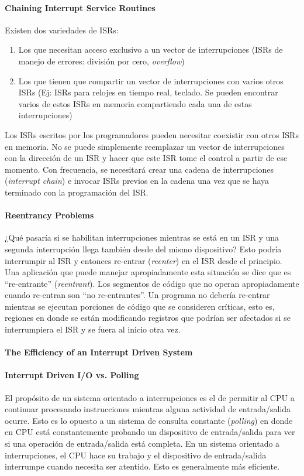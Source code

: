 \paragraph{\textnormal{\textbf{Chaining Interrupt Service Routines}}}
Existen dos variedades de ISRs:
\begin{enumerate}
    \item Los que necesitan acceso exclusivo a un vector de interrupciones (ISRs de manejo de errores: división por cero, \textit{overflow})
    \item Los que tienen que compartir un vector de interrupciones con varios otros ISRs (Ej: ISRs para relojes en tiempo real, teclado. Se pueden encontrar varios de estos ISRs en memoria compartiendo cada una de estas interrupciones)
\end{enumerate}
Los ISRs escritos por los programadores pueden necesitar coexistir con otros ISRs en memoria. No se puede simplemente reemplazar un vector de interrupciones con la dirección de un ISR y hacer que este ISR tome el control a partir de ese momento. Con frecuencia, se necesitará crear una cadena de interrupciones (\textit{interrupt chain}) e invocar ISRs previos en la cadena una vez que se haya terminado con la programación del ISR.

\paragraph{\textnormal{\textbf{Reentrancy Problems}}}
¿Qué pasaría si se habilitan interrupciones mientras se está en un ISR y una segunda interrupción llega también desde del mismo dispositivo? Esto podría interrumpir al ISR y entonces re-entrar (\textit{reenter}) en el ISR desde el principio. Una aplicación que puede manejar apropiadamente esta situación se dice que es ``re-entrante'' (\textit{reentrant}). Los segmentos de código que no operan apropiadamente cuando re-entran son ``no re-entrantes''. Un programa no debería re-entrar mientras se ejecutan porciones de código que se consideren críticas, esto es, regiones en donde se están modificando registros que podrían ser afectados si se interrumpiera el ISR y se fuera al inicio otra vez.


\paragraph{\textnormal{\textbf{The Efficiency of an Interrupt Driven System}}}

\paragraph{Interrupt Driven I/O vs. Polling}
El propósito de un sistema orientado a interrupciones es el de permitir al CPU a continuar procesando instrucciones mientras alguna actividad de entrada/salida ocurre. Esto es lo opuesto a un sistema de consulta constante (\textit{polling}) en donde en CPU está constantemente probando un dispositivo de entrada/salida para ver si una operación de entrada/salida está completa. En un sistema orientado a interrupciones, el CPU hace su trabajo y el dispositivo de entrada/salida interrumpe cuando necesita ser atentido. Esto es generalmente más eficiente. 

